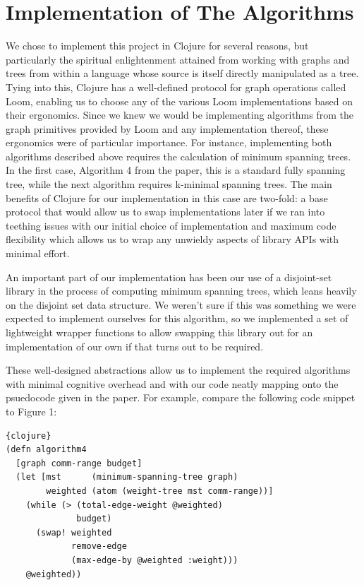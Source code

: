 \documentclass{article}
\begin{document}
\section{Implementation of The Algorithms}
We chose to implement this project in Clojure for several reasons, but particularly the spiritual enlightenment attained from working with graphs and trees from within a language whose source is itself directly manipulated as a tree. Tying into this, Clojure has a well-defined protocol for graph operations called Loom, enabling us to choose any of the various Loom implementations based on their ergonomics. Since we knew we would be implementing algorithms from the graph primitives provided by Loom and any implementation thereof, these ergonomics were of particular importance. For instance, implementing both algorithms described above requires the calculation of minimum spanning trees. In the first case, Algorithm 4 from the paper, this is a standard fully spanning tree, while the next algorithm requires k-minimal spanning trees. The main benefits of Clojure for our implementation in this case are two-fold: a base protocol that would allow us to swap implementations later if we ran into teething issues with our initial choice of implementation and maximum code flexibility which allows us to wrap any unwieldy aspects of library APIs with minimal effort.

An important part of our implementation has been our use of a disjoint-set library in the process of computing minimum spanning trees, which leans heavily on the disjoint set data structure. We weren't sure if this was something we were expected to implement ourselves for this algorithm, so we implemented a set of lightweight wrapper functions to allow swapping this library out for an implementation of our own if that turns out to be required.

These well-designed abstractions allow us to implement the required algorithms with minimal cognitive overhead and with our code neatly mapping onto the psuedocode given in the paper. For example, compare the following code snippet to Figure 1:

\begin{lstlisting}{clojure}
(defn algorithm4
  [graph comm-range budget]
  (let [mst      (minimum-spanning-tree graph)
        weighted (atom (weight-tree mst comm-range))]
    (while (> (total-edge-weight @weighted)
              budget)
      (swap! weighted
             remove-edge
             (max-edge-by @weighted :weight)))
    @weighted))
\end{lstlisting}
\end{document}
